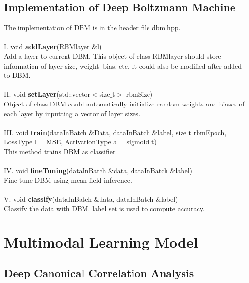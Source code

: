 \documentclass[12pt]{article}
\begin{document}
\subsection{Implementation of Deep Boltzmann Machine}
The implementation of DBM is in the header file dbm.hpp.\\
\\
I. void \textbf{addLayer}(RBMlayer $\&$l)\\
Add a layer to current DBM. This object of class RBMlayer should store information of layer size, weight, bias, etc. It could also be modified after added to DBM.\\
\\
II. void \textbf{setLayer}(std::vector$<$size$\_$t$>$ rbmSize)\\
Object of class DBM could automatically initialize random weights and biases of each layer by inputting a vector of layer sizes.\\
\\
III. void \textbf{train}(dataInBatch $\&$Data, dataInBatch $\&$label, size$\_$t rbmEpoch, LossType l = MSE, ActivationType a = sigmoid$\_$t)\\
This method trains DBM as classifier.\\
\\
IV. void \textbf{fineTuning}(dataInBatch $\&$data, dataInBatch $\&$label)\\
Fine tune DBM using mean field inference.\\
\\
V. void \textbf{classify}(dataInBatch $\&$data, dataInBatch $\&$label)\\
Classify the data with DBM. label set is used to compute accuracy.
\clearpage
\section{Multimodal Learning Model}
\subsection{Deep Canonical Correlation Analysis}
\end{document}
